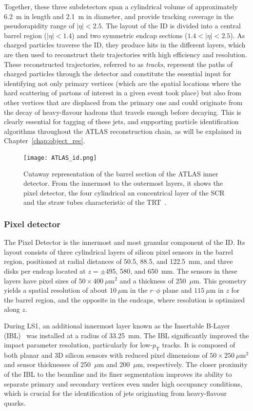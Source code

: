 Together, these three subdetectors span a cylindrical volume of approximately 6.2~m in length and 2.1~m in diameter, and provide tracking coverage in the pseudorapidity range of $|\eta| < 2.5$. The layout of the ID is divided into a central barrel region ($|\eta| < 1.4$) and two symmetric endcap sections ($1.4 < |\eta| < 2.5$). As charged particles traverse the ID, they produce hits in the different layers, which are then used to reconstruct their trajectories with high efficiency and resolution. 
These reconstructed trajectories, referred to as \textit{tracks}, represent the paths of charged particles through the detector and constitute the essential input for identifying not only primary vertices (which are the spatial locations where the hard scattering of partons of interest in a given event took place) but also from other vertices that are displaced from the primary one and could originate from the decay of heavy-flavour hadrons that travels enough before decaying. This is clearly essential for tagging of these jets, and supporting particle identification algorithms throughout the ATLAS reconstruction chain, as will be explained in Chapter~\ref{chap:object_rec}.
\begin{figure}[htbp]
    \centering
        \texttt{[image: ATLAS\_id.png]}
    \caption{Cutaway representation of the barrel section of the ATLAS inner detector. From the innermost to the outermost layers, it shows the pixel detector, the four cylindrical an concentrical layer of the SCR and the straw tubes characteristic of the TRT~\cite{Collaboration:2723878}.}
    \label{fig:id}
\end{figure}

\subsubsection*{Pixel detector}

The Pixel Detector is the innermost and most granular component of the ID. Its layout consists of three cylindrical layers of silicon pixel sensors in the barrel region, positioned at radial distances of 50.5, 88.5, and 122.5~mm, and three disks per endcap located at $z = \pm$495, 580, and 650~mm. The sensors in these layers have pixel sizes of $50 \times 400~\mu\text{m}^2$ and a thickness of 250~$\mu$m. This geometry yields a spatial resolution of about $10~\mu$m in the $r\text{--}\phi$ plane and $115~\mu$m in $z$ for the barrel region, and the opposite in the endcaps, where resolution is optimized along $z$.

During LS1, an additional innermost layer known as the Insertable B-Layer (IBL)~\cite{IBL} was installed at a radius of 33.25~mm. The IBL significantly improved the impact parameter resolution, particularly for low-$p_{\mathrm{T}}$ tracks. It is composed of both planar and 3D silicon sensors with reduced pixel dimensions of $50 \times 250~\mu\text{m}^2$ and sensor thicknesses of 250~$\mu$m and 200~$\mu$m, respectively. The closer proximity of the IBL to the beamline and its finer segmentation improves its ability to separate primary and secondary vertices even under high occupancy conditions, which is crucial for the identification of jets originating from heavy-flavour quarks.

